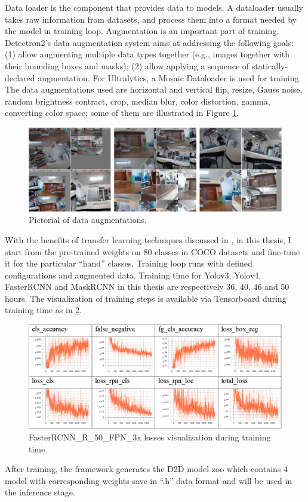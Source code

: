 Data loader is the component that provides data to models. A dataloader usually takes raw information from datasets, and process them into a format needed by the model in training loop. Augmentation is an important part of training. Detectron2’s data augmentation system aims at addressing the following goals: (1) allow augmenting multiple data types together (e.g., images together with their bounding boxes and masks); (2) allow applying a sequence of statically-declared augmentation. For Ultralytics, a Mosaic Dataloader is used for training. The data augmentations used are horizontal and vertical flip, resize, Gauss noise, random brightness contract, crop, median blur, color distortion, gamma, converting color space; some of them are illustrated in Figure \ref{fig:augmentation}.
\begin{figure}[!htb]
	\centerline{\includegraphics[width=1\linewidth]{Figs/augmentation.png}}
	\caption{Pictorial of data augmentations.}
	\label{fig:augmentation}
\end{figure}
With the benefits of transfer learning techniques discussed in \cite{DBLP:journals/corr/abs-1808-01974}, in this thesis, I start from the pre-trained weights on 80 classes in COCO datasets and fine-tune it for the particular “hand” classes. Training loop runs with defined configurations and augmented data. Training time for Yolov3, Yolov4, FasterRCNN and MaskRCNN in this thesis are respectively 36, 40, 46 and 50 hours.
The visualization of training steps is available via Tensorboard during training time as in \ref{fig:tensorboard}.
\begin{figure}
	\centerline{\includegraphics[width=1\linewidth]{Figs/tensorboard.png}}
	\caption{FasterRCNN\_R\_50\_FPN\_3x losses visualization during training time.}
	\label{fig:tensorboard}
\end{figure}
After training, the framework generates the D2D model zoo which contains 4 model with corresponding weights save in “.h” data format and will be used in the inference stage.
